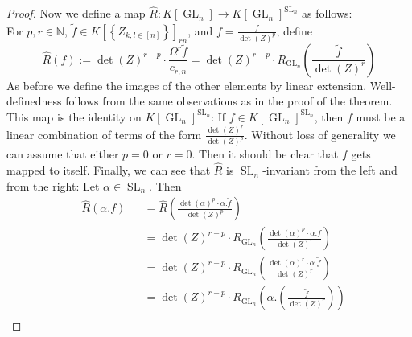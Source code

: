 \begin{proof}
  Now we define a map $\hat{R} \colon K \left\lbrack \operatorname{GL}_n \right\rbrack \longrightarrow K \left\lbrack \operatorname{GL}_n \right\rbrack ^{\operatorname{SL}_n} $ as follows: \\
  For $ p,r \in \mathbb{N} $, $ \tilde{f} \in K \left\lbrack \left\lbrace Z_{k,l \in [ n ]} \right\rbrace \right\rbrack_{rn} $, and $ f = \frac{\tilde{f}}{\operatorname{det} (Z)^p } $, define
  \begin{equation}
    \hat{R} (f) := \operatorname{det} (Z)^{r-p} \cdot \frac{ \Omega^r \tilde{f} }{ c_{r,n} }
    = \operatorname{det} (Z)^{r-p} \cdot R_{\operatorname{GL}_n} \left( \frac{\tilde{f}}{\operatorname{det} (Z) ^r} \right)
  \end{equation}
  As before we define the images of the other elements by linear extension.
  Well-definedness follows from the same observations as in the proof of the theorem.
  This map is the identity on $ K \left\lbrack \operatorname{GL}_n \right\rbrack ^{\operatorname{SL}_n }$:
  If $f \in K[\operatorname{GL}_n]^{\operatorname{SL}_n}$, then $f$ must be a linear combination of terms of the form $\frac{\operatorname{det}(Z)^r}{\operatorname{det}(Z)^p}$.
  Without loss of generality we can assume that either $p=0$ or $r=0$.
  Then it should be clear that $f$ gets mapped to itself.
  Finally, we can see that $\hat{R}$ is $\operatorname{SL}_n$-invariant from the left and from the right:
  Let $\alpha \in \operatorname{SL}_n$.
  Then
  \begin{equation}
    \begin{aligned}
      &\hat{R} (\alpha . f)
      &&= \hat{R} \left( \frac{ \operatorname{det} (\alpha)^p \cdot \alpha . \tilde{f} }{ \operatorname{det} (Z)^p } \right)  \\
      &&&= \operatorname{det} (Z)^{r-p} \cdot R_{\operatorname{GL}_n} \left( \frac{ \operatorname{det} (\alpha)^p \cdot \alpha . \tilde{f} }{ \operatorname{det}(Z)^r } \right)  \\
      &&&= \operatorname{det} (Z)^{r-p} \cdot R_{\operatorname{GL}_n} \left( \frac{ \operatorname{det} (\alpha)^r \cdot \alpha . \tilde{f} }{ \operatorname{det}(Z)^r } \right)  \\
      &&&= \operatorname{det} (Z)^{r-p} \cdot R_{\operatorname{GL}_n} \left( \alpha . \left( \frac{ \tilde{f} }{ \operatorname{det} (Z)^r } \right) \right)  \\

\end{aligned}
\end{equation}
\end{proof}
